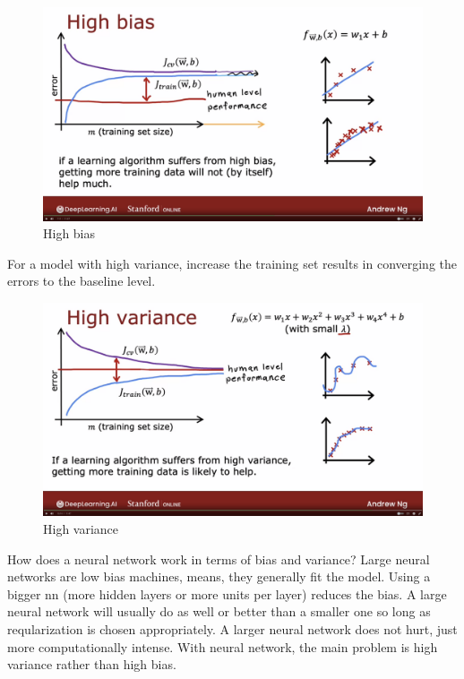 \documentclass[12pt]{report}
\begin{document}
\begin{figure}[H]
  \centering
  \caption{High bias}
  \includegraphics[trim =0.0cm 0.0cm 0.0cm 0.0cm, clip, scale=0.12]{pics/highBias.png}
\end{figure}

For a model with high variance, increase the training set results in converging the errors to the baseline level.

\begin{figure}[H]
  \centering
  \caption{High variance}
  \includegraphics[trim =0.0cm 0.0cm 0.0cm 0.0cm, clip, scale=0.12]{pics/highVariance.png}
\end{figure}

How does a neural network work in terms of bias and variance? Large neural networks are low bias machines, means, they generally fit the model. Using a bigger nn (more hidden layers or more units per layer) reduces the bias. A large neural network will usually do as well or better than a smaller one so long as reqularization is chosen appropriately. A larger neural network does not hurt, just more computationally intense. With neural network, the main problem is high variance rather than high bias.
\end{document}
